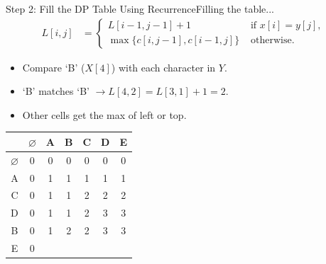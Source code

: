 \documentclass{beamer}
\begin{document}
\begin{frame}{Step 2: Fill the DP Table Using Recurrence}{Filling the table...}
    \vspace{-10mm}
    \scriptsize
    \begin{equation*}
        \begin{align*}
            L[i, j] &=
                        \begin{cases}
                            L[i - 1, j - 1] + 1 & \text{ if } x[i] = y[j] \text{, } \\
                            \max \{ c[i, j - 1], c[i - 1, j] \} & \text{ otherwise.}
                        \end{cases}
        \end{align*}
    \end{equation*}
    \begin{itemize}
        \item Compare `B' ($X[4]$) with each character in $Y$.
        \item `B' matches `B' $\longrightarrow L[4,2] = L[3,1] + 1 = 2$.
        \item Other cells get the max of left or top.
    \end{itemize}
    \vspace{6mm}
    \normalsize
    \centering
    \begin{tabular}{|c|c|c|c|c|c|c|} \hline
                      & $\varnothing$ & A & B & C & D & E \\ \hline
        $\varnothing$ &        0      & 0 & 0 & 0 & 0 & 0 \\ \hline
               A      &        0      & 1 & 1 & 1 & 1 & 1 \\ \hline
               C      &        0      & 1 & 1 & 2 & 2 & 2 \\ \hline
               D      &        0      & 1 & 1 & 2 & 3 & 3 \\ \hline
               B      &        0      & 1 & 2 & 2 & 3 & 3 \\ \hline
               E      &        0      &   &   &   &   &   \\ \hline
    \end{tabular}
\end{frame}
\end{document}
